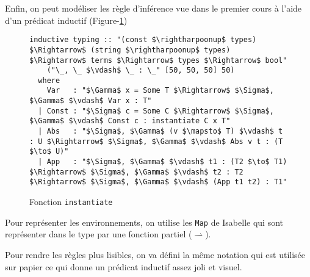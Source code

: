 \documentclass{article}
\theoremstyle{plain}
\begin{document}
Enfin, on peut modéliser les règle d'inférence vue dans le premier cours à
l'aide d'un prédicat inductif (Figure-\ref{fig:ptype}) 

  \begin{figure}[thpb]
  \begin{lstlisting}
inductive typing :: "(const $\rightharpoonup$ types) $\Rightarrow$ (string $\rightharpoonup$ types) $\Rightarrow$ terms $\Rightarrow$ types $\Rightarrow$ bool"
    ("\_, \_ $\vdash$ \_ : \_" [50, 50, 50] 50)
  where
    Var   : "$\Gamma$ x = Some T $\Rightarrow$ $\Sigma$, $\Gamma$ $\vdash$ Var x : T"
  | Const : "$\Sigma$ c = Some C $\Rightarrow$ $\Sigma$, $\Gamma$ $\vdash$ Const c : instantiate C x T"
  | Abs   : "$\Sigma$, $\Gamma$ (v $\mapsto$ T) $\vdash$ t : U $\Rightarrow$ $\Sigma$, $\Gamma$ $\vdash$ Abs v t : (T $\to$ U)"
  | App   : "$\Sigma$, $\Gamma$ $\vdash$ t1 : (T2 $\to$ T1) $\Rightarrow$ $\Sigma$, $\Gamma$ $\vdash$ t2 : T2 $\Rightarrow$ $\Sigma$, $\Gamma$ $\vdash$ (App t1 t2) : T1"
  \end{lstlisting}
  \caption{Fonction \texttt{instantiate}}
  \label{fig:ptype}
  \end{figure}

  Pour représenter les environnements, on utilise les \texttt{Map} de Isabelle
  qui sont représenter dans le type par une fonction partiel
  ($\rightharpoonup$).

  Pour rendre les règles plus lisibles, on va défini la même notation qui est
  utilisée sur papier ce qui donne un prédicat inductif assez joli et visuel.
\end{document}
